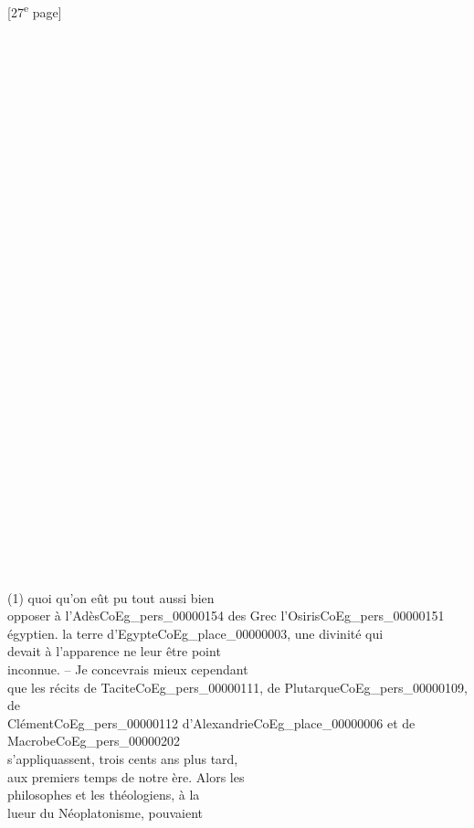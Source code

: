 \documentclass{book}
\begin{document}
{{\footnotesize\begin{center} {[27\textsuperscript{e} page]}\end{center}}

\begin{paracol}{2}
\noindent \\
\\
\\
\\
\\
\\
\\
\\
\\
\\
\\
\\
\\
\\
\\
\\
\\
\\
\\
\\
\\
\\
\\
\\
\\
\\
\\
\\
\\
\\
\\
(1) quoi qu’on eût pu tout aussi bien\\
opposer à l’Adès\gls{CoEg_pers_00000154} des Grec l’Osiris\gls{CoEg_pers_00000151} égyptien.
\switchcolumn
\noindent la terre d’Egypte\gls{CoEg_place_00000003}, une divinité qui\\
devait à l’apparence ne leur être point\\
inconnue. – Je concevrais mieux cependant\\
que les récits de Tacite\gls{CoEg_pers_00000111}, de Plutarque\gls{CoEg_pers_00000109}, de\\
Clément\gls{CoEg_pers_00000112} d’Alexandrie\gls{CoEg_place_00000006} et de Macrobe\gls{CoEg_pers_00000202}\\
s’appliquassent, trois cents ans plus tard,\\
aux premiers temps de notre ère. Alors les\\
philosophes et les théologiens, à la\\
lueur du Néoplatonisme, pouvaient\\

\end{paracol}}
\end{document}
